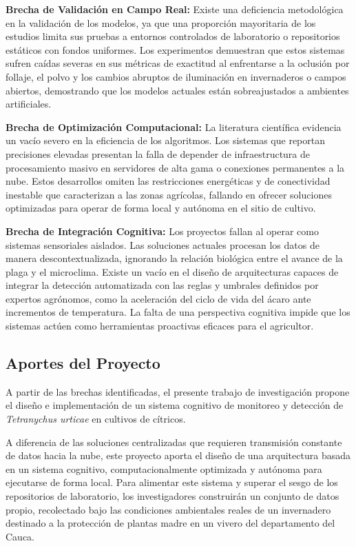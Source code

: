\documentclass[12pt,letterpaper]{article}
\begin{document}
\vspace{0.3cm}
\noindent\textbf{Brecha de Validación en Campo Real:} Existe una deficiencia metodológica en la validación de los modelos, ya que una proporción mayoritaria de los estudios limita sus pruebas a entornos controlados de laboratorio o repositorios estáticos con fondos uniformes. Los experimentos demuestran que estos sistemas sufren caídas severas en sus métricas de exactitud al enfrentarse a la oclusión por follaje, el polvo y los cambios abruptos de iluminación en invernaderos o campos abiertos, demostrando que los modelos actuales están sobreajustados a ambientes artificiales.

\vspace{0.3cm}
\noindent\textbf{Brecha de Optimización Computacional:} La literatura científica evidencia un vacío severo en la eficiencia de los algoritmos. Los sistemas que reportan precisiones elevadas presentan la falla de depender de infraestructura de procesamiento masivo en servidores de alta gama o conexiones permanentes a la nube. Estos desarrollos omiten las restricciones energéticas y de conectividad inestable que caracterizan a las zonas agrícolas, fallando en ofrecer soluciones optimizadas para operar de forma local y autónoma en el sitio de cultivo.

\vspace{0.3cm}
\noindent\textbf{Brecha de Integración Cognitiva:} Los proyectos fallan al operar como sistemas sensoriales aislados. Las soluciones actuales procesan los datos de manera descontextualizada, ignorando la relación biológica entre el avance de la plaga y el microclima. Existe un vacío en el diseño de arquitecturas capaces de integrar la detección automatizada con las reglas y umbrales definidos por expertos agrónomos, como la aceleración del ciclo de vida del ácaro ante incrementos de temperatura. La falta de una perspectiva cognitiva impide que los sistemas actúen como herramientas proactivas eficaces para el agricultor.

\subsection{Aportes del Proyecto}

A partir de las brechas identificadas, el presente trabajo de investigación propone el diseño e implementación de un sistema cognitivo de monitoreo y detección de \textit{Tetranychus urticae} en cultivos de cítricos.

A diferencia de las soluciones centralizadas que requieren transmisión constante de datos hacia la nube, este proyecto aporta el diseño de una arquitectura basada en un sistema cognitivo, computacionalmente optimizada y autónoma para ejecutarse de forma local. Para alimentar este sistema y superar el sesgo de los repositorios de laboratorio, los investigadores construirán un conjunto de datos propio, recolectado bajo las condiciones ambientales reales de un invernadero destinado a 
la protección de plantas madre en un vivero del departamento del Cauca.
\end{document}
